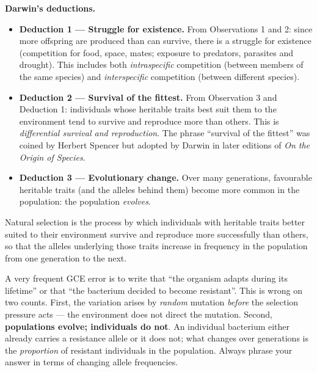\documentclass[11pt]{article}
\newcommand{\cle}[1]{{\popxbold\color{popdark}#1}}
\begin{document}
\textbf{Darwin's deductions.}
\begin{itemize}
\item \textbf{Deduction 1 — Struggle for existence.} From Observations 1 and 2: since more offspring are produced than can survive, there is a \cle{struggle for existence} (competition for food, space, mates; exposure to predators, parasites and drought). This includes both \emph{intraspecific} competition (between members of the same species) and \emph{interspecific} competition (between different species).
\item \textbf{Deduction 2 — Survival of the fittest.} From Observation 3 and Deduction 1: individuals whose heritable traits best suit them to the environment tend to survive and reproduce more than others. This is \emph{differential survival and reproduction}. The phrase ``survival of the fittest'' was coined by Herbert Spencer but adopted by Darwin in later editions of \emph{On the Origin of Species}.
\item \textbf{Deduction 3 — Evolutionary change.} Over many generations, favourable heritable traits (and the alleles behind them) become more common in the population: the population \emph{evolves}.
\end{itemize}

\begin{definition}
\cle{Natural selection} is the process by which individuals with heritable traits better suited to their environment survive and reproduce more successfully than others, so that the alleles underlying those traits increase in frequency in the population from one generation to the next.
\end{definition}

\begin{attention}
A very frequent GCE error is to write that ``the organism adapts during its lifetime'' or that ``the bacterium decided to become resistant''. This is wrong on two counts. First, the variation arises by \emph{random} mutation \emph{before} the selection pressure acts — the environment does not direct the mutation. Second, \textbf{populations evolve; individuals do not}. An individual bacterium either already carries a resistance allele or it does not; what changes over generations is the \emph{proportion} of resistant individuals in the population. Always phrase your answer in terms of changing allele frequencies.
\end{attention}
\end{document}
